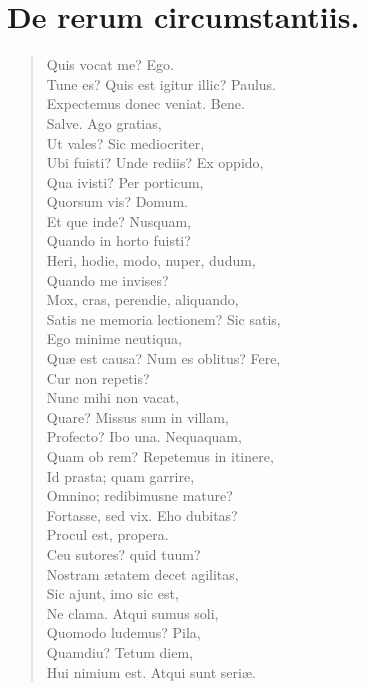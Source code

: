 \documentclass[12pt,  postvopaper]{memoir}
\begin{document}
\chapter{De rerum circumstantiis.}

\begin{verse}

  Quis vocat me? Ego.\\
  Tune es? Quis est igitur illic? Paulus.\\
  Expectemus donec veniat. Bene.\\
  Salve. Ago gratias,\\
  Ut vales? Sic mediocriter,\\
  Ubi fuisti? Unde rediis? Ex oppido,\\
  Qua ivisti? Per porticum,\\
  Quorsum vis? Domum.\\
  Et que inde? Nusquam,\\
  Quando in horto fuisti?\\
  Heri, hodie, modo, nuper, dudum,\\
  Quando me invises?\\
  Mox, cras, perendie, aliquando,\\
  Satis ne memoria lectionem? Sic satis,\\
  Ego minime neutiqua,\\
  Quæ est causa? Num es oblitus? Fere,\\
  Cur non repetis?\\
  Nunc mihi non vacat,\\
  Quare? Missus sum in villam,\\
  Profecto? Ibo una. Nequaquam,\\
  Quam ob rem? Repetemus in itinere,\\
  Id prasta; quam garrire,\\
  Omnino; redibimusne mature?\\
  Fortasse, sed vix. Eho dubitas?\\
  Procul est, propera.\\
  Ceu sutores? quid tuum?\\
  Nostram ætatem decet agilitas,\\
  Sic ajunt, imo sic est,\\
  Ne clama. Atqui sumus soli,\\
  Quomodo ludemus? Pila,\\
  Quamdiu? Tetum diem,\\
  Hui nimium est. Atqui sunt seriæ.\\
\end{verse}
\end{document}
